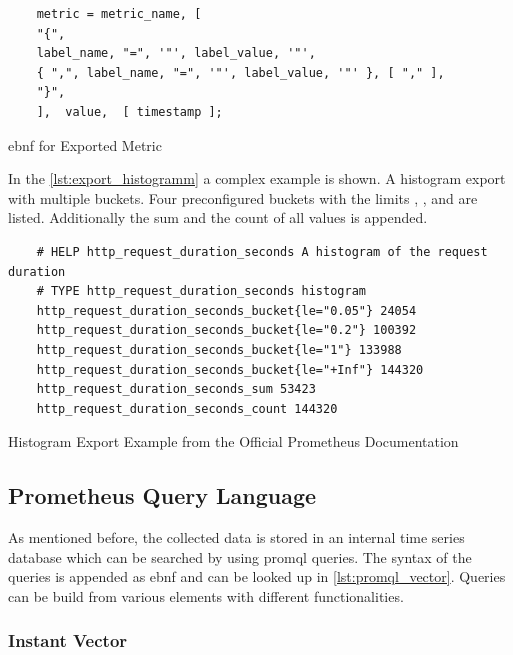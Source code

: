 \begin{listing}[!ht]
	\begin{verbatim}
	metric = metric_name, [ 
	"{",
	label_name, "=", '"', label_value, '"',
	{ ",", label_name, "=", '"', label_value, '"' }, [ "," ], 
	"}",
	],  value,  [ timestamp ];
	\end{verbatim}
	\caption{\gls{ebnf} for Exported Metric}
	\label{lst:ebnf_metric_export}
\end{listing}

In the \cref{lst:export_histogramm} a complex example is shown. A histogram export with multiple buckets. Four preconfigured buckets with the limits , ,  and  are listed. Additionally the sum and the count of all values is appended. 

\begin{listing}[!ht]
	\begin{verbatim}
	# HELP http_request_duration_seconds A histogram of the request duration
	# TYPE http_request_duration_seconds histogram
	http_request_duration_seconds_bucket{le="0.05"} 24054
	http_request_duration_seconds_bucket{le="0.2"} 100392
	http_request_duration_seconds_bucket{le="1"} 133988
	http_request_duration_seconds_bucket{le="+Inf"} 144320
	http_request_duration_seconds_sum 53423
	http_request_duration_seconds_count 144320
	\end{verbatim}
	\caption[Histogram Export Example from the Official Prometheus Documentation]{Histogram Export Example from the Official Prometheus Documentation~\cite{PrometheusExpositionFormatBeispiel}}
	\label{lst:export_histogramm}
\end{listing}

\subsection{Prometheus Query Language}
\label{subsec:promql}

As mentioned before, the collected data is stored in an internal time series database which can be searched by using \gls{promql} queries.
The syntax of the queries is appended as \gls{ebnf} and can be looked up in \cref{lst:promql_vector}.
Queries can be build from various elements with different functionalities.

\subsubsection{Instant Vector}

